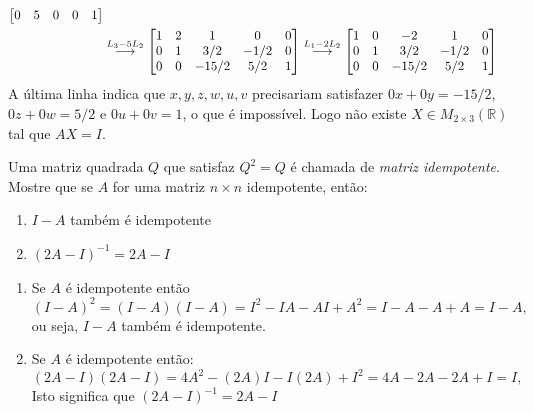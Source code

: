 \documentclass[12pt,a4paper]{article}
\newcommand*\R{\mathbb{R}}
\newcommand{\grstep}[2][\relax]{%
   \ensuremath{\mathrel{
       {\mathop{\longrightarrow}\limits^{#2\mathstrut}_{
                                     \begin{subarray}{l} #1 \end{subarray}}}}}}
\begin{document}
\begin{ExerciseList}
\begin{align*}
\begin{bmatrix}
0 & 5 & 0 & 0 & 1
\end{bmatrix} \\
& \grstep{ L_3 - 5 L_2 }
\begin{bmatrix}
1 & 2 & 1 & 0 & 0 \\
0 & 1 & 3/2 & -1/2 & 0 \\
0 & 0 & -15/2 & 5/2 & 1
\end{bmatrix}
\grstep{ L_1 - 2 L_2 }
\begin{bmatrix}
1 & 0 & -2 & 1 & 0 \\
0 & 1 & 3/2 & -1/2 & 0 \\
0 & 0 & -15/2 & 5/2 & 1
\end{bmatrix}
\end{align*}
A última linha indica que $x,y,z,w,u,v$ precisariam satisfazer $0x + 0y = -15/2$, $0z + 0w = 5/2$ e $0u + 0v = 1$, o que é impossível. Logo não existe $X \in M_{2 \times 3} (\R)$ tal que $AX = I$.


\Exercise[title={1,8}] Uma matriz quadrada $Q$ que satisfaz $Q^2 = Q$ é chamada de \emph{matriz idempotente}.
Mostre que se $A$ for uma matriz $n \times n$ idempotente, então:
\begin{enumerate}
\item $I-A$ também é idempotente
\item $(2A-I)^{-1} = 2A - I$
\end{enumerate}

\Answer
\begin{enumerate}

\item Se $A$ é idempotente então
\[
(I - A)^2
= (I - A)(I - A)
= I^2 - IA - AI + A^2
= I - A - A + A
= I - A,
\]
ou seja, $I-A$ também é idempotente.

\item Se $A$ é idempotente então:
\[
(2A - I) (2A - I)
= 4A^2 - (2A)I - I(2A) + I^2
= 4A - 2A - 2A + I
= I,
\]
Isto significa que $(2A-I)^{-1} = 2A - I$
\end{enumerate}



\end{ExerciseList}
\end{document}
